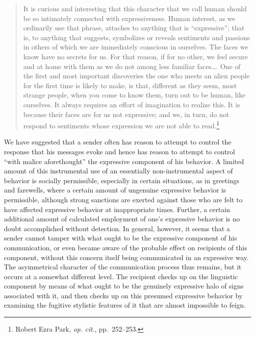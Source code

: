 \documentclass[twoside,symmetric,nobib,justified]{tufte-book}
\begin{document}
\begin{quote}
It is curious and interesting that this character that we call human
should be so intimately connected with expres­siveness. Human interest,
as we ordinarily use that phrase, attaches to anything that is
``expressive''; that is, to any­thing that suggests, symbolizes or
reveals sentiments and passions in others of which we are immediately
conscious in ourselves. The faces we know have no secrets for us. For
that reason, if for no other, we feel secure and at home with them as we
do not among less familiar faces\ldots. One of the first and most
important discoveries the one who meets an alien people for the first
time is likely to make, is that, different as they seem, most strange
people, when you come to know them, turn out to be human, like
our­selves. It always requires an effort of imagination to realize this.
It is because their faces are for us not ex­pressive; and we, in turn, do
not respond to sentiments whose expression we are not able to
read.\footnote{Robert Ezra Park, \emph{op. cit.}, pp.~252--253.}
\end{quote}

\noindent We have suggested that a sender often has reason to at­tempt to control
the response that his messages evoke and hence has reason to attempt to
control ``with malice aforethought'' the expressive component of his
behavior. A limited amount of this instrumental use of an essentially
non-instrumental aspect of behavior is socially permissible, especially
in certain situa­tions, as in greetings and farewells, where a certain
amount of ungenuine expressive behavior is permissible, although strong
sanctions are exerted against those who are felt to have affected
expressive behavior at inappropriate times. Further, a certain
additional amount of calculated employment of one's expressive behavior
is no doubt accomplished without detection. In general, however, it
seems that a sender cannot tamper with what ought to be the expressive
component of his communication, or even became aware of the probable
effect on recipients of this component, without this concern itself
being communicated in an expressive way. The asymmetrical character of
the communication process thus remains, but it occurs at a somewhat
different level. The recipient checks up on the linguistic component by
means of what ought to be the genuinely expressive halo of signs
associated with it, and then checks up on this presumed expressive
behavior by examining the fugitive stylistic features of it that are
al­most impossible to feign.
\end{document}
